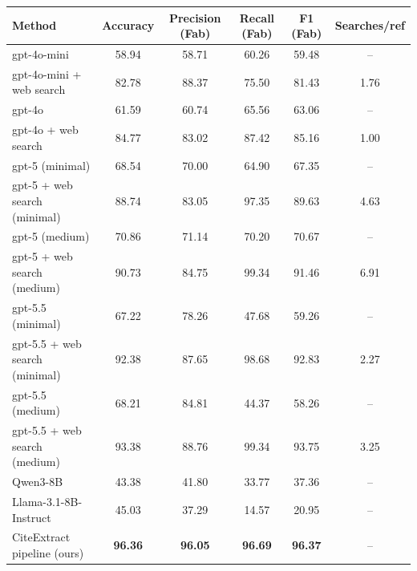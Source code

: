 \begin{tabular}{lccccc}
\toprule
Method & Accuracy & Precision (Fab) & Recall (Fab) & F1 (Fab) & Searches/ref \\
\midrule
gpt-4o-mini & 58.94 & 58.71 & 60.26 & 59.48 & -- \\
gpt-4o-mini + web search & 82.78 & 88.37 & 75.50 & 81.43 & 1.76 \\
gpt-4o & 61.59 & 60.74 & 65.56 & 63.06 & -- \\
gpt-4o + web search & 84.77 & 83.02 & 87.42 & 85.16 & 1.00 \\
gpt-5 (minimal) & 68.54 & 70.00 & 64.90 & 67.35 & -- \\
gpt-5 + web search (minimal) & 88.74 & 83.05 & 97.35 & 89.63 & 4.63 \\
gpt-5 (medium) & 70.86 & 71.14 & 70.20 & 70.67 & -- \\
gpt-5 + web search (medium) & 90.73 & 84.75 & 99.34 & 91.46 & 6.91 \\
gpt-5.5 (minimal) & 67.22 & 78.26 & 47.68 & 59.26 & -- \\
gpt-5.5 + web search (minimal) & 92.38 & 87.65 & 98.68 & 92.83 & 2.27 \\
gpt-5.5 (medium) & 68.21 & 84.81 & 44.37 & 58.26 & -- \\
gpt-5.5 + web search (medium) & 93.38 & 88.76 & 99.34 & 93.75 & 3.25 \\
Qwen3-8B & 43.38 & 41.80 & 33.77 & 37.36 & -- \\
Llama-3.1-8B-Instruct & 45.03 & 37.29 & 14.57 & 20.95 & -- \\
CiteExtract pipeline (ours) & \textbf{96.36} & \textbf{96.05} & \textbf{96.69} & \textbf{96.37} & -- \\
\bottomrule
\end{tabular}
